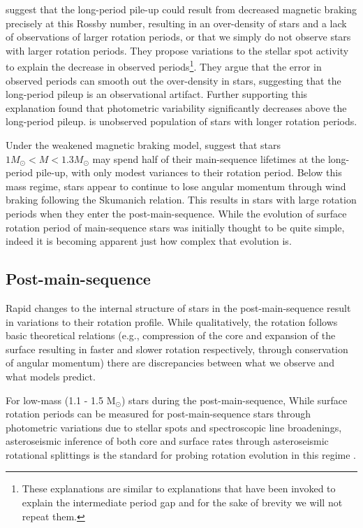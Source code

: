 \citet{van_saders_forward_2019} suggest that the long-period pile-up could result from decreased magnetic braking precisely at this Rossby number, resulting in an over-density of stars and a lack of observations of larger rotation periods, or that we simply do not observe stars with larger rotation periods.
They propose variations to the stellar spot activity to explain the decrease in observed periods\footnote{These explanations are similar to explanations that have been invoked to explain the intermediate period gap and for the sake of brevity we will not repeat them.}.
They argue that the error in observed periods can smooth out the over-density in stars, suggesting that the long-period pileup is an observational artifact.
Further supporting this explanation \citet{david_further_2022} found that photometric variability significantly decreases above the long-period pileup.
 is unobserved population of stars with longer rotation periods.

Under the weakened magnetic braking model, \citet{david_further_2022} suggest that stars $1M_{\odot} < M < 1.3M_{\odot}$  may spend half of their main-sequence lifetimes at the long-period pile-up, with only modest variances to their rotation period.
Below this mass regime, stars appear to continue to lose angular momentum through wind braking following the Skumanich relation.
This results in stars with large rotation periods when they enter the post-main-sequence.
While the evolution of surface rotation period of main-sequence stars was initially thought to be quite simple, indeed it is becoming apparent just how complex that evolution is.


\subsection{Post-main-sequence}

Rapid changes to the internal structure of stars in the post-main-sequence result in variations to their rotation profile.
While qualitatively, the rotation follows basic theoretical relations (e.g., compression of the core and expansion of the surface resulting in faster and slower rotation respectively, through conservation of angular momentum) there are discrepancies between what we observe and what models predict.

For low-mass (1.1 - 1.5 M$_{\odot}$) stars during the post-main-sequence, 
While surface rotation periods can be measured for post-main-sequence stars through photometric variations due to stellar spots \citep{mcquillan_rotation_2014, ceillier_surface_2017} and spectroscopic line broadenings, asteroseismic inference of both core and surface rates through asteroseismic rotational splittings is the standard for probing rotation evolution in this regime \citep{deheuvels_seismic_2014, gehan_core_2018, deheuvels_seismic_2020, fellay_asteroseismology_2021}.


